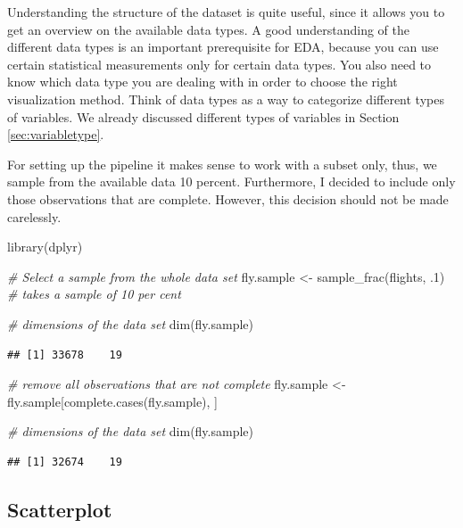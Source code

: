 \documentclass[
]{book}
\newenvironment{Shaded}{\begin{snugshade}}{\end{snugshade}}
\newcommand{\CommentTok}[1]{\textcolor[rgb]{0.56,0.35,0.01}{\textit{#1}}}
\newcommand{\DecValTok}[1]{\textcolor[rgb]{0.00,0.00,0.81}{#1}}
\newcommand{\FunctionTok}[1]{\textcolor[rgb]{0.00,0.00,0.00}{#1}}
\newcommand{\NormalTok}[1]{#1}
\newcommand{\OtherTok}[1]{\textcolor[rgb]{0.56,0.35,0.01}{#1}}
\begin{document}
Understanding the structure of the dataset is quite useful, since it allows you to get an overview on the available data types. A good understanding of the different data types is an important prerequisite for EDA, because you can use certain statistical measurements only for certain data types. You also need to know which data type you are dealing with in order to choose the right visualization method. Think of data types as a way to categorize different types of variables. We already discussed different types of variables in Section \ref{sec:variabletype}.

For setting up the pipeline it makes sense to work with a subset only, thus, we sample from the available data 10 percent. Furthermore, I decided to include only those observations that are complete. However, this decision should not be made carelessly.

\begin{Shaded}
\begin{Highlighting}[]
\FunctionTok{library}\NormalTok{(dplyr)}

\CommentTok{\# Select a sample from the whole data set}
\NormalTok{fly.sample }\OtherTok{\textless{}{-}} \FunctionTok{sample\_frac}\NormalTok{(flights, .}\DecValTok{1}\NormalTok{) }\CommentTok{\# takes a sample of 10 per cent}

\CommentTok{\# dimensions of the data set}
\FunctionTok{dim}\NormalTok{(fly.sample) }
\end{Highlighting}
\end{Shaded}

\begin{verbatim}
## [1] 33678    19
\end{verbatim}

\begin{Shaded}
\begin{Highlighting}[]
\CommentTok{\# remove all observations that are not complete}
\NormalTok{fly.sample }\OtherTok{\textless{}{-}}\NormalTok{ fly.sample[}\FunctionTok{complete.cases}\NormalTok{(fly.sample), ]}

\CommentTok{\# dimensions of the data set}
\FunctionTok{dim}\NormalTok{(fly.sample)}
\end{Highlighting}
\end{Shaded}

\begin{verbatim}
## [1] 32674    19
\end{verbatim}

\hypertarget{scatterplot}{%
\subsection{Scatterplot}\label{scatterplot}}
\end{document}
